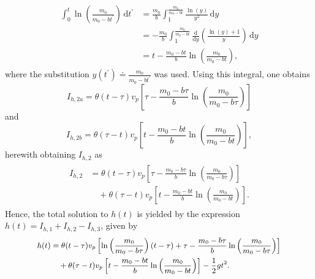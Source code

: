 \documentclass[a4paper,11pt]{report}
\begin{document}
\begin{align}
\begin{aligned}
\int_{0}^{t} \ln\left(\frac{m_0}{m_0-bt^\prime}\right)\,\mathrm{d}t^\prime &= \frac{m_0}{b}\int_{1}^{\tfrac{m_0}{m_0-bt}}\frac{\ln(y)}{y^2}\,\mathrm{d}y \\ &= -\frac{m_0}{b}\int_{1}^{\tfrac{m_0}{m_0-bt}}\frac{\mathrm{d}}{\mathrm{d}y}\left(\frac{\ln(y)+1}{y}\right)\,\mathrm{d}y \\
&= t- \frac{m_0-bt}{b}\ln\left(\frac{m_0}{m_0-bt}\right),
\end{aligned}
\end{align} where the substitution $y(t^\prime) \doteq \tfrac{m_0}{m_0-bt^\prime}$ was used. Using this integral, one obtains \begin{equation}
I_{h,2a} = \theta(t-\tau)v_p\left[\tau- \frac{m_0-b\tau}{b}\ln\left(\frac{m_0}{m_0-b\tau}\right)\right]
\end{equation} and \begin{equation}
I_{h,2b} = \theta(\tau - t)v_p\left[t- \frac{m_0-bt}{b}\ln\left(\frac{m_0}{m_0-bt}\right)\right],
\end{equation} herewith obtaining $I_{h,2}$ as \begin{align}\begin{aligned}
I_{h,2} &= \theta(t-\tau)v_p\left[\tau- \frac{m_0-b\tau}{b}\ln\left(\frac{m_0}{m_0-b\tau}\right)\right] \\ &\quad + \theta(\tau - t)v_p\left[t- \frac{m_0-bt}{b}\ln\left(\frac{m_0}{m_0-bt}\right)\right].
\end{aligned}\end{align} Hence, the total solution to $h(t)$ is yielded by the expression $h(t) = I_{h,1} + I_{h,2} - I_{h,3}$, given by \begin{align}\label{eq:generalanalyticalsolution}
\small\begin{aligned}
h(t) &= \theta(t-\tau)v_p\left[\ln\left(\frac{m_0}{m_0-b\tau}\right)(t-\tau) + \tau-\frac{m_0-b\tau}{b}\ln\left(\frac{m_0}{m_0-b\tau}\right)\right] \\
&\quad + \theta(\tau-t)v_p\left[t-\frac{m_0-bt}{b}\ln\left(\frac{m_0}{m_0-bt}\right)\right] - \frac{1}{2}gt^2.
\end{aligned}
\end{align}
\end{document}
